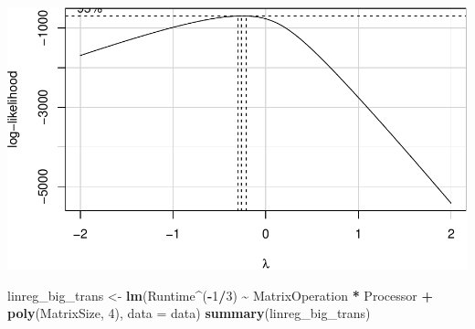 \documentclass[
]{article}
\newenvironment{Shaded}{\begin{snugshade}}{\end{snugshade}}
\newcommand{\DataTypeTok}[1]{\textcolor[rgb]{0.13,0.29,0.53}{#1}}
\newcommand{\DecValTok}[1]{\textcolor[rgb]{0.00,0.00,0.81}{#1}}
\newcommand{\KeywordTok}[1]{\textcolor[rgb]{0.13,0.29,0.53}{\textbf{#1}}}
\newcommand{\NormalTok}[1]{#1}
\newcommand{\OperatorTok}[1]{\textcolor[rgb]{0.81,0.36,0.00}{\textbf{#1}}}
\newcommand{\StringTok}[1]{\textcolor[rgb]{0.31,0.60,0.02}{#1}}
\begin{document}
\includegraphics{main_files/figure-latex/unnamed-chunk-22-2.pdf}

\begin{Shaded}
\begin{Highlighting}[]
\NormalTok{linreg\_big\_trans \textless{}{-}}\StringTok{ }\KeywordTok{lm}\NormalTok{(Runtime}\OperatorTok{\^{}}\NormalTok{(}\OperatorTok{{-}}\DecValTok{1}\OperatorTok{/}\DecValTok{3}\NormalTok{) }\OperatorTok{\textasciitilde{}}\StringTok{ }\NormalTok{MatrixOperation }\OperatorTok{*}\StringTok{ }\NormalTok{Processor }\OperatorTok{+}\StringTok{ }
\StringTok{                         }\KeywordTok{poly}\NormalTok{(MatrixSize, }\DecValTok{4}\NormalTok{),}
                       \DataTypeTok{data =}\NormalTok{ data)}
\KeywordTok{summary}\NormalTok{(linreg\_big\_trans)}
\end{Highlighting}
\end{Shaded}
\end{document}
